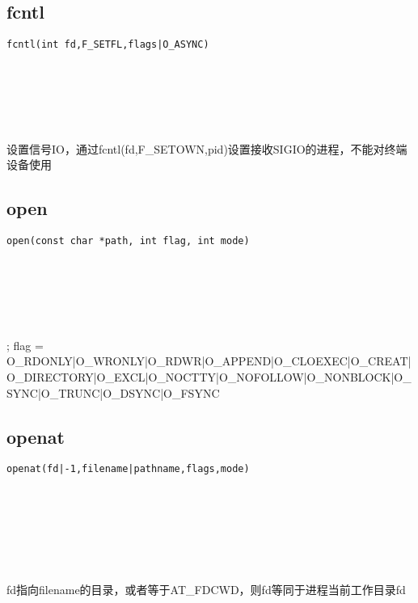 \documentclass[10pt,a4paper]{article}
\begin{document}
\subsection{fcntl}
\begin{spacing}{2.0}
\lstset{language=C,numbers=none}
\begin{lstlisting}
fcntl(int fd,F_SETFL,flags|O_ASYNC)
\end{lstlisting}
{\large\color[rgb]{0.2,0.4,0.6}{int fd:}} \\
{\large\color[rgb]{0.2,0.4,0.6}{F\_SETFL:}} \\
{\large\color[rgb]{0.2,0.4,0.6}{flags|O\_ASYNC:}}
\paragraph{ \ \ }设置信号IO，通过fcntl(fd,F\_SETOWN,pid)设置接收SIGIO的进程，不能对终端设备使用
\end{spacing}


\subsection{open}
\begin{spacing}{2.0}
\lstset{language=C,numbers=none}
\begin{lstlisting}
open(const char *path, int flag, int mode)
\end{lstlisting}
{\large\color[rgb]{0.2,0.4,0.6}{*path:}} \\
{\large\color[rgb]{0.2,0.4,0.6}{flag:}} \\
{\large\color[rgb]{0.2,0.4,0.6}{mode:}}
\paragraph{ \ \ }; flag = O\_RDONLY|O\_WRONLY|O\_RDWR|O\_APPEND|O\_CLOEXEC|O\_CREAT|O\_DIRECTORY|O\_EXCL|O\_NOCTTY|O\_NOFOLLOW|O\_NONBLOCK|O\_SYNC|O\_TRUNC|O\_DSYNC|O\_FSYNC
\end{spacing}

\subsection{openat}
\begin{spacing}{2.0}
\lstset{language=C,numbers=none}
\begin{lstlisting}
openat(fd|-1,filename|pathname,flags,mode)
\end{lstlisting}
{\large\color[rgb]{0.2,0.4,0.6}{fd|-1:}} \\
{\large\color[rgb]{0.2,0.4,0.6}{filename|pathname:}} \\
{\large\color[rgb]{0.2,0.4,0.6}{flags:}} \\
{\large\color[rgb]{0.2,0.4,0.6}{mode:}}
\paragraph{ \ \ }fd指向filename的目录，或者等于AT\_FDCWD，则fd等同于进程当前工作目录fd
\end{spacing}
\end{document}

